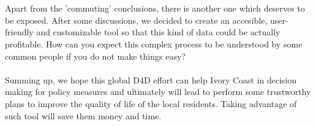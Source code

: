 \\
\\
Apart from the 'commuting' conclusions, there is another one which deserves to be exposed. After some discussions, we decided to create an accesible, user-friendly and customizable tool so that this kind of data could be actually profitable. How can you expect this complex process to be understood by some common people if you do not make things easy?
\\
\\
Summing up, we hope this global D4D effort can help Ivory Coast in decision making for policy measures and ultimately will lead to perform some trustworthy plans to improve the quality of life of the local residents. Taking advantage of such tool will save them money and time.
\\
\\

